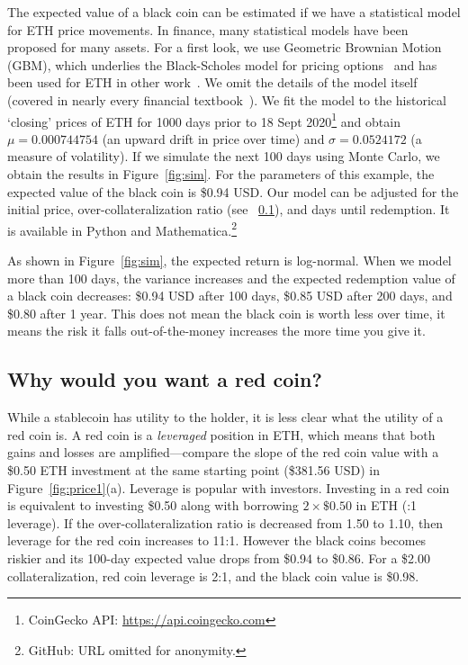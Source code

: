 The expected value of a black coin can be estimated if we have a statistical model for ETH price movements. In finance, many statistical models have been proposed for many assets. For a first look, we use Geometric Brownian Motion (GBM), which underlies the Black-Scholes model for pricing options~\cite{BS73} and has been used for ETH in other work~\cite{GPH+20}. We omit the details of the model itself (covered in nearly every  financial textbook~\cite{Sey09}). We fit the model to the historical `closing' prices of ETH for 1000 days prior to 18 Sept 2020\footnote{CoinGecko API: \url{https://api.coingecko.com}} and obtain $\mu=0.000744754$ (an upward drift in price over time) and $\sigma=0.0524172$ (a measure of volatility). If we simulate the next 100 days using Monte Carlo, we obtain the results in Figure~\ref{fig:sim}. For the parameters of this example, the expected value of the black coin is \$0.94 USD. Our model can be adjusted for the initial price, over-collateralization ratio (see ~\ref{sec:redchar}), and days until redemption. It is available in Python and Mathematica.\footnote{GitHub: URL omitted for anonymity.} 

As shown in Figure~\ref{fig:sim}, the expected return is log-normal. When we model more than 100 days, the variance increases and the expected redemption value of a black coin decreases: \$0.94 USD after 100 days, \$0.85 USD after 200 days, and \$0.80 after 1 year. This does not mean the black coin is worth less over time, it means the risk it falls out-of-the-money increases the more time you give it. 


\subsection{Why would you want a red coin?}
\label{sec:redchar}

While a stablecoin has utility to the holder, it is less clear what the utility of a red coin is. A red coin is a \textit{leveraged} position in ETH, which means that both gains and losses are amplified---compare the slope of the red coin value with a \$0.50 ETH investment at the same starting point (\$381.56 USD) in Figure~\ref{fig:price1}(a). Leverage is popular with investors. Investing in a red coin is equivalent to investing \$0.50 along with borrowing $2\times\$0.50$ in ETH (:1 leverage). If the over-collateralization ratio is decreased from 1.50 to 1.10, then leverage for the red coin increases to 11:1. However the black coins becomes riskier and its 100-day expected value drops from \$0.94 to \$0.86. For a \$2.00 collateralization, red coin leverage is 2:1, and the black coin value is \$0.98. 

